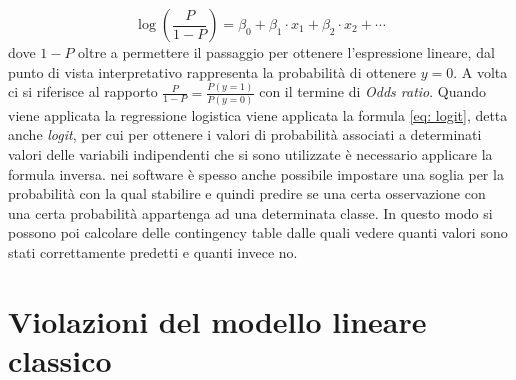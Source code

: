 \documentclass[]{article}
\begin{document}
\begin{equation}
\log(\frac{P}{1-P}) = \beta_0 + \beta_1 \cdot x_1 + \beta_2 \cdot x_2 + \cdots
\label{eq: logit}
\end{equation}
dove $1-P$ oltre a permettere il passaggio per ottenere l'espressione lineare, dal punto di vista interpretativo rappresenta la probabilità di ottenere $y = 0$. A volta ci si riferisce al rapporto $\frac{P}{1-P}=\frac{P(y=1)}{P(y=0)}$ con il termine di \textit{Odds ratio}. Quando viene applicata la regressione logistica viene applicata la formula \eqref{eq: logit}, detta anche \textit{logit}, per cui per ottenere i valori di probabilità associati a determinati valori delle variabili indipendenti che si sono utilizzate è necessario applicare la formula inversa.
nei software è spesso anche possibile impostare una soglia per la probabilità con la qual stabilire e quindi predire se una certa osservazione con una certa probabilità appartenga ad una determinata classe. In questo modo si possono poi calcolare delle contingency table dalle quali vedere quanti valori sono stati correttamente predetti e quanti invece no.

\section{Violazioni del modello lineare classico}
\end{document}
